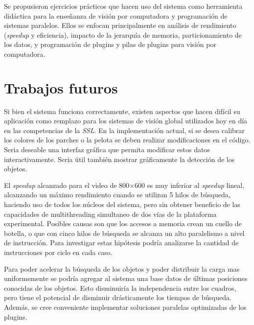 Se propusieron ejercicios prácticos que hacen uso del sistema como herramienta
didáctica para la enseñanza de visión por computadora y programación de sistemas
paralelos. Ellos se enfocan principalmente en análisis de rendimiento
(\emph{speedup} y eficiencia), impacto de la jerarquía de memoria,
particionamiento de los datos, y programación de plugins y pilas de plugins para
visión por computadora.

\section{Trabajos futuros}

\label{trabajosFuturos}

Si bien el sistema funciona correctamente, existen aspectos que hacen difícil su
aplicación como remplazo para los sistemas de visión global utilizados hoy en
día en las competencias de la \emph{SSL}. En la implementación actual, si se
desea calibrar los colores de los parches o la pelota se deben realizar
modificaciones en el código. Seria deseable una interfaz gráfica que permita
modificar estos datos interactivamente. Seria útil también mostrar gráficamente
la detección de los objetos.

El \emph{speedup} alcanzado para el video de 800$\times$600 es muy inferior al
\emph{speedup} lineal, alcanzando un máximo rendimiento cuando se utilizan 5
hilos de búsqueda, haciendo uso de todos los núcleos del sistema, pero sin
obtener beneficio de las capacidades de multithreading simultaneo de dos vías de
la plataforma experimental. Posibles causas son que los accesos a memoria crean
un cuello de botella, o que con cinco hilos de búsqueda se alcanza un alto
paralelismo a nivel de instrucción. Para investigar estas hipótesis podría
analizarse la cantidad de instrucciones por ciclo en cada caso.

Para poder acelerar la búsqueda de los objetos y poder distribuir la carga mas
uniformemente se podría agregar al sistema una base datos de últimas posiciones
conocidas de los objetos. Esto disminuiría la independencia entre los cuadros,
pero tiene el potencial de disminuir drásticamente los tiempos de búsqueda.
Además, se cree conveniente implementar soluciones paralelas optimizadas de los
plugins.

